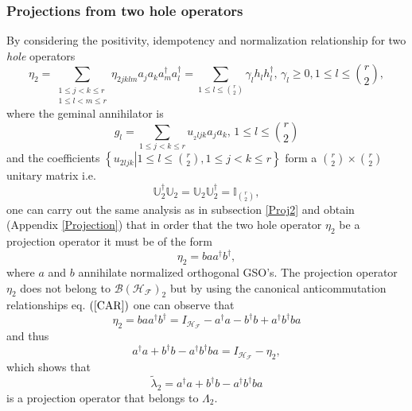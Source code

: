 \documentclass[aps,preprint,amsfonts,amssymb,showpacs,showkeys]{revtex4}%
\begin{document}
\subsubsection{Projections from two hole operators}

By considering the positivity, idempotency and normalization relationship for
two \emph{hole} operators
\begin{equation}
\eta_{2}=\sum_{\substack{1\leq j<k\leq r\\1\leq l<m\leq r}}\eta_{2jklm}%
a_{j}a_{k}a_{m}^{\dagger}a_{l}^{\dagger}=\sum_{1\leq l\leq\binom{r}{2}}%
\gamma_{l}h_{l}h_{l}^{\dagger},\,\gamma_{l}\geq0,1\leq l\leq\binom{r}{2},
\end{equation}
where the geminal annihilator is
\begin{equation}
g_{l}=\sum_{1\leq j<k\leq r}u_{_{2}ljk}a_{j}a_{k},\,1\leq l\leq\binom{r}{2}%
\end{equation}
and the coefficients $\left\{  \left.  u_{2ljk}\right\vert 1\leq l\leq
\binom{r}{2},1\leq j<k\leq r\right\}  $ form a $\binom{r}{2}\times\binom{r}%
{2}$ unitary matrix i.e.
\begin{equation}
\mathbb{U}_{2}^{\dagger}\mathbb{U}_{2}=\mathbb{U}_{2}\mathbb{U}_{2}^{\dagger
}=\mathbb{I}_{\binom{r}{2}},
\end{equation}
one can carry out the same analysis as in subsection \ref{Proj2} and obtain
(Appendix \ref{Projection}) that in order that the two hole operator $\eta
_{2}$ be a projection operator it must be of the form
\begin{equation}
\eta_{2}=baa^{\dagger}b^{\dagger},
\end{equation}
where $a$ and $b$ annihilate normalized orthogonal GSO's. The projection
operator $\eta_{2}$ does not belong to $\mathcal{B}\left(  \mathcal{H}%
_{\mathcal{F}}\right)  _{2}$ but by using the canonical anticommutation
relationships eq. $\left(  \ref{CAR}\right)  $ one can observe that
\begin{equation}
\eta_{2}=baa^{\dagger}b^{\dagger}=I_{\mathcal{H}_{\mathcal{F}}}-a^{\dagger
}a-b^{\dagger}b+a^{\dagger}b^{\dagger}ba
\end{equation}
and thus
\begin{equation}
a^{\dagger}a+b^{\dagger}b-a^{\dagger}b^{\dagger}ba=I_{\mathcal{H}%
_{\mathcal{F}}}-\eta_{2},
\end{equation}
which shows that
\begin{equation}
\tilde{\lambda}_{2}=a^{\dagger}a+b^{\dagger}b-a^{\dagger}b^{\dagger}ba
\end{equation}
is a projection operator that belongs to $\Lambda_{2}.$
\end{document}
